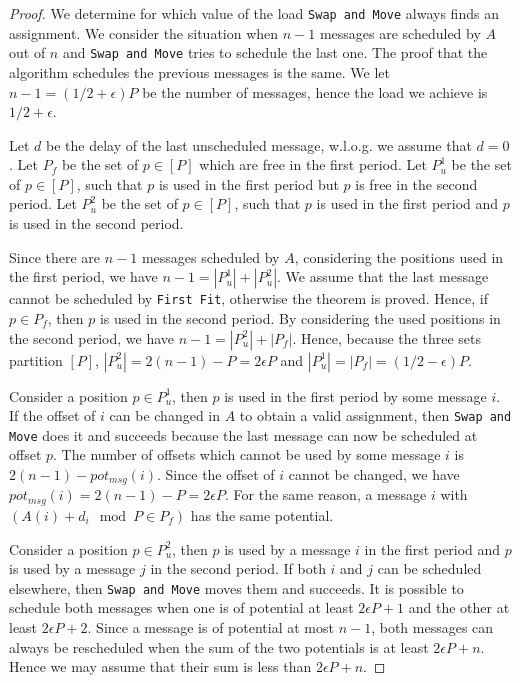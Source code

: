 \documentclass[a4paper,UKenglish,cleveref, autoref, thm-restate]{lipics-v2019}
\newcommand\firstfit{\texttt{First Fit}\xspace}
\newcommand\swapandmove{\texttt{Swap and Move}\xspace}
\begin{document}
\begin{proof}
We determine for which value of the load \swapandmove always finds an assignment.
We consider the situation when $n-1$ messages are scheduled by $A$ out of $n$ and \swapandmove tries to schedule the last one. 
The proof that the algorithm schedules the previous messages is the same. 
 We let $n - 1 = (1/2 + \epsilon)P$ be the number of messages, hence the load we achieve is $1/2 + \epsilon$. 

Let $d$ be the delay of the last unscheduled message, w.l.o.g. we assume that $d = 0$. 
Let $P_f$ be the set of $p\in [P]$ which are free in the first period. Let $P^1_{u}$ be the set of $p\in [P]$,
such that $p$ is used in the first period but $p$ is free in the second period. Let $P^2_{u}$ be the set of $p\in [P]$,
such that $p$ is used in the first period and $p$ is used in the second period. 

Since there are $n-1$ messages scheduled by $A$, considering the positions used in the first period, we have $n-1 = |P^1_u| + |P^2_u|$.
We assume that the last message cannot be scheduled by \firstfit, otherwise the theorem is proved. Hence, 
if $p\in P_f$, then $p$ is used in the second period. By considering the used positions in the second period, we have $n - 1 = |P^2_u| + |P_f|$.
Hence, because the three sets partition $[P]$, $|P^2_u| = 2(n-1) - P = 2\epsilon P$ and $|P^1_u| = |P_f| = (1/2 - \epsilon)P$.

Consider a position $p \in P^1_u$, then $p$ is used in the first period by some message $i$.
If the offset of $i$ can be changed in $A$ to obtain a valid assignment, then \swapandmove does it and succeeds because the last message can now be scheduled at offset $p$.
The number of offsets which cannot be used by some message $i$ is $2(n-1) - pot_{msg}(i)$. Since the offset of $i$ cannot be changed, we have
$pot_{msg}(i) = 2(n-1) - P = 2\epsilon P$. For the same reason, a message $i$ with $(A(i) + d_i \mod P \in P_f)$ has the same potential.

Consider a position $p \in P^2_u$, then $p$ is used by a message $i$ in the first period and $p$ is used by a message
$j$ in the second period. If both $i$ and $j$ can be scheduled elsewhere, then \swapandmove moves them and succeeds. 
It is possible to schedule both messages when one is of potential at least $2\epsilon P + 1$ and the other at least $2\epsilon P + 2$. 
Since a message is of potential at most $n-1$, both messages can always be rescheduled when the sum of the two potentials is at least $2\epsilon P + n$.
Hence we may assume that their sum is less than $2 \epsilon P + n$. 


\end{proof}
\end{document}
